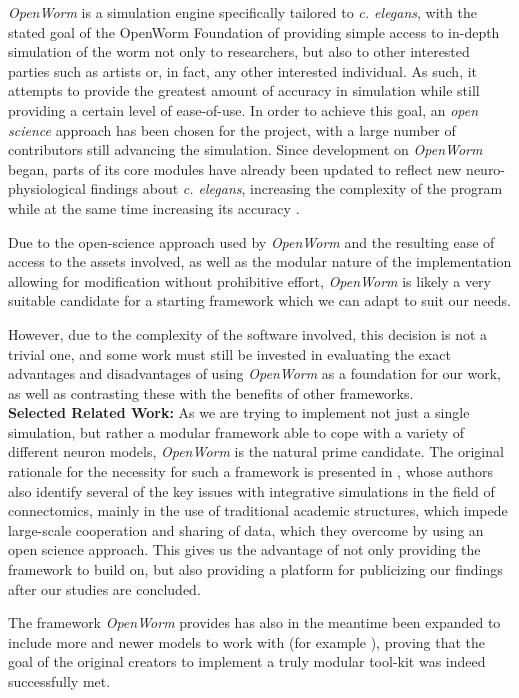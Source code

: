 \documentclass[a4paper,11pt]{article}
\begin{document}
\emph{OpenWorm} is a simulation engine specifically tailored to \emph{c. elegans}, with the stated goal of the OpenWorm Foundation of providing simple access to in-depth simulation of the worm not only to researchers, but also to other interested parties such as artists or, in fact, any other interested individual. As such, it attempts to provide the greatest amount of accuracy in simulation while still providing a certain level of ease-of-use. In order to achieve this goal, an \emph{open science} \citep{nielsen2012reinventing} approach has been chosen for the project, with a large number of contributors still advancing the simulation. Since development on \emph{OpenWorm} began, parts of its core modules have already been updated to reflect new neuro-physiological findings about \emph{c. elegans}, increasing the complexity of the program while at the same time increasing its accuracy \citep{vella2013integration}.

Due to the open-science approach used by \emph{OpenWorm} and the resulting ease of access to the assets involved, as well as the modular nature of the implementation allowing for modification without prohibitive effort, \emph{OpenWorm} is likely a very suitable candidate for a starting framework which we can adapt to suit our needs.

However, due to the complexity of the software involved, this decision is not a trivial one, and some work must still be invested in evaluating the exact advantages and disadvantages of using \emph{OpenWorm} as a foundation for our work, as well as contrasting these with the benefits of other frameworks.
\\[0,2cm]

\textbf{Selected Related Work:}
As we are trying to implement not just a single simulation, but rather a modular framework able to cope with a variety of different neuron models, \emph{OpenWorm} is the natural prime candidate. The original rationale for the necessity for such a framework is presented in \citep{Szigeti2014}, whose authors also identify several of the key issues with integrative simulations in the field of connectomics, mainly in the use of traditional academic structures, which impede large-scale cooperation and sharing of data, which they overcome by using an open science approach. This gives us the advantage of not only providing the framework to build on, but also providing a platform for publicizing our findings after our studies are concluded.

The framework \emph{OpenWorm} provides has also in the meantime been expanded to include more and newer models to work with (for example \citep{vella2013integration}), proving that the goal of the original creators to implement a truly modular tool-kit was indeed successfully met.
\end{document}
